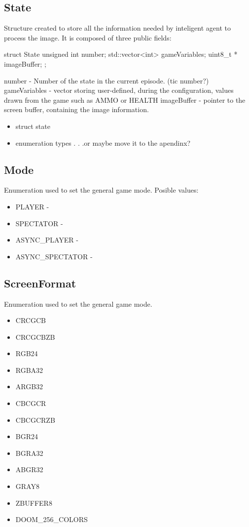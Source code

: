 \subsection{State}


Structure created to store all the information needed by inteligent agent to process the image.  
It is composed of three public fields:

\vspace{20pt}	
\begin{clinee}
	struct State {
	    unsigned int number; 
	    std::vector<int> gameVariables;
	    uint8_t * imageBuffer;
	};
\end{clinee}
number - Number of the state in the current episode. (tic number?)\\
gameVariables - vector storing user-defined, during the configuration, values drawn from the game such as AMMO or HEALTH 
imageBuffer - pointer to the screen buffer, containing the image information.
\begin{itemize}
\item struct state
\item enumeration types . . .or maybe move it to the apendinx?
\end{itemize}
\subsection{Mode}
Enumeration used to set the general game mode.
Posible values:
\begin{itemize}
\item PLAYER - 
\item SPECTATOR -
\item ASYNC\_PLAYER -
\item ASYNC\_SPECTATOR -
\end{itemize}
\subsection{ScreenFormat}
Enumeration used to set the general game mode.
\begin{itemize}
 \item CRCGCB 
 \item CRCGCBZB
 \item RGB24
 \item RGBA32
 \item ARGB32
 \item CBCGCR
 \item CBCGCRZB
 \item BGR24
 \item BGRA32
 \item ABGR32
 \item GRAY8
 \item ZBUFFER8
 \item DOOM\_256\_COLORS
\end{itemize}
